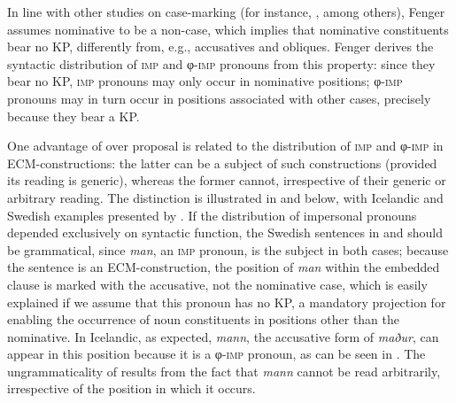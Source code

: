 \documentclass[output=paper]{langscibook}
\begin{document}
In line with other studies on case-marking (for instance, \citealt{BittnerHale1996, NeelemanWeerman1999}, among others), Fenger assumes nominative to be a non-case, which implies that nominative constituents bear no KP, differently from, e.g., accusatives and obliques. Fenger derives the syntactic distribution of \textsc{imp} and φ-\textsc{imp} pronouns from this property: since they bear no KP, \textsc{imp} pronouns may only occur in nominative positions; φ-\textsc{imp} pronouns may in turn occur in positions associated with other cases, precisely because they bear a KP.\largerpage[-1]

One advantage of  over  proposal is related to the distribution of \textsc{imp} and φ-\textsc{imp} in ECM-constructions: the latter can be a subject of such constructions (provided its reading is generic), whereas the former cannot, irrespective of their generic or {arbitrary reading. The distinction is illustrated in  and  below, with Icelandic and Swedish examples presented by \citet[299--300]{Fenger2018}. If the distribution of impersonal pronouns depended exclusively on syntactic function, the Swedish sentences in  and  should be grammatical, since} {\textit{man}}{, an \textsc{imp} pronoun, is the subject in both cases; because the sentence is an ECM-construction, the position of} {\textit{man} }{within the embedded clause is marked with the accusative, not the nominative case, which is easily explained if we assume that this pronoun has no KP, a mandatory projection for enabling the occurrence of noun constituents in positions other than the nominative. In Icelandic, as expected,} {\textit{mann}}{, the accusative form of} {\textit{maður}}{, can appear in this position because it is a φ-\textsc{imp} pronoun, as can be seen in . The ungrammaticality of  results from the fact that} \textit{mann} cannot be read arbitrarily, irrespective of the position in which it occurs.\largerpage
\end{document}
